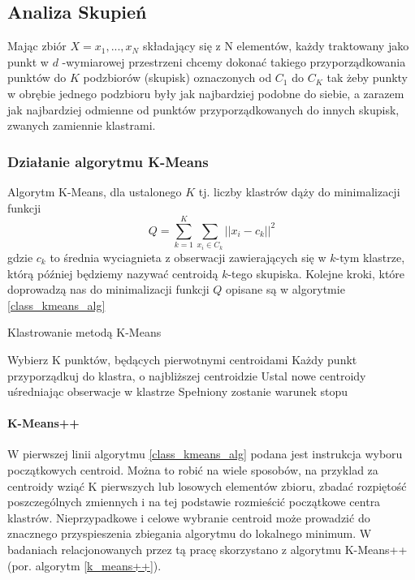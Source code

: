 \documentclass{article}
\begin{document}
\subsection{Analiza Skupień}
Mając zbiór $X = {x_1, ..., x_N}$ składający się z N  elementów, każdy traktowany jako punkt w  $d$ -wymiarowej przestrzeni chcemy
dokonać takiego przyporządkowania punktów do $K$ podzbiorów (skupisk) oznaczonych od \(C_1\) do \(C_K\) tak żeby punkty w obrębie jednego podzbioru były jak najbardziej
podobne do siebie, a zarazem jak najbardziej odmienne od punktów przyporządkowanych
do innych skupisk, zwanych zamiennie klastrami.

\subsubsection{Działanie algorytmu K-Means}
Algorytm K-Means, dla ustalonego \(K\) tj. liczby klastrów dąży do minimalizacji funkcji 
\[Q = \sum\limits^K_{k=1}\sum\limits_{x_i \in C_k} ||x_i - c_k||^2\]
gdzie \(c_k\) to średnia wyciagnieta z obserwacji zawierających się w \(k\)-tym klastrze, którą później będziemy nazywać centroidą $k$-tego skupiska.
Kolejne kroki, które doprowadzą nas do minimalizacji funkcji $Q$ opisane są w algorytmie \ref{class_kmeans_alg}

\begin{algorithm}
\caption{Klastrowanie metodą K-Means}
\label{class_kmeans_alg}
\begin{algorithmic}[1]
\STATE Wybierz K punktów, będących pierwotnymi centroidami
\REPEAT
\STATE Każdy punkt przyporządkuj do klastra, o najbliższej centroidzie
\STATE Ustal nowe centroidy uśredniając obserwacje w klastrze
\UNTIL Spełniony zostanie warunek stopu
\end{algorithmic}
\end{algorithm}	

\paragraph{K-Means++}
W pierwszej linii algorytmu \ref{class_kmeans_alg} podana jest instrukcja wyboru początkowych centroid. 
Można to robić na wiele sposobów, na przyklad za centroidy wziąć K pierwszych lub losowych elementów zbioru, zbadać rozpiętość poszczególnych zmiennych i na tej podstawie rozmieścić początkowe centra klastrów.
Nieprzypadkowe i celowe wybranie centroid może prowadzić do znacznego przyspieszenia zbiegania algorytmu do lokalnego minimum.
W badaniach relacjonowanych przez tą pracę skorzystano z algorytmu K-Means++ (por. algorytm \ref{k_means++})\cite{C.K.Reddy2014}.
\end{document}
